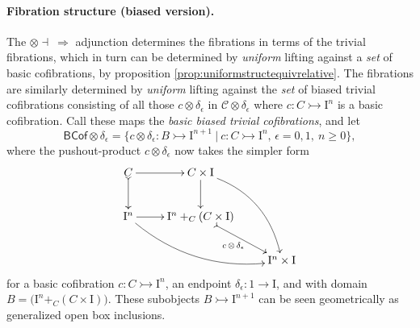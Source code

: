 \documentclass[12pt]{article}
\newcommand{\mono}{\ensuremath{\rightarrowtail}}
\newcommand{\ra}{\ensuremath{\rightarrow}}
\newcommand{\I}{\ensuremath{\mathrm{I}}}
\theoremstyle{remark}
\theoremstyle{definition}
\begin{document}
\paragraph{Fibration structure (biased version).}
The $\otimes\dashv\ \Rightarrow$ adjunction determines the fibrations in terms of the trivial fibrations, which in turn can be determined by \emph{uniform} lifting against a \emph{set} of basic cofibrations, by proposition \ref{prop:uniformstructequivrelative}.  The fibrations are similarly determined by \emph{uniform} lifting against the \emph{set} of biased trivial cofibrations consisting of all those $c \otimes \delta_\epsilon$ in $\mathcal{C}\otimes \delta_\epsilon$ where $c : C \mono \I^n$ is a basic cofibration.  
Call these maps the \emph{basic biased trivial cofibrations}, and let 
\begin{equation}\label{eq:basicTCof}
\mathsf{BCof}\otimes \delta_\epsilon = \{c \otimes \delta_\epsilon : B \mono \I^{n+1}\ |\ c : C\mono \I^n,\,\epsilon = 0,1,\ n\geq 0 \},
\end{equation}
where the pushout-product $c\otimes\delta_\epsilon$ now takes the simpler form
\begin{equation}\label{diagram:basicpushoutproduct}
\xymatrix{
C \ar@{>->}[d] \ar[r] & C\times \I \ar[d] \ar@/^4ex/ [rdd]\\
\I^{n} \ar@/_4ex/ [rrd] \ar[r] &  \I^n +_C (C\times\I) \ar@{>->}[rd]_{c\, \otimes\, \delta_\epsilon} \\
&& \I^{n}\times\I
}
\end{equation}
for a basic cofibration $c : C\mono \I^n$, an endpoint $\delta_\epsilon:1 \ra \I$, and with domain $B = \big(\I^n +_C (C\times\I)\big)$.   These subobjects $B \mono \I^{n+1}$ can be seen geometrically as generalized open box inclusions.
\end{document}
